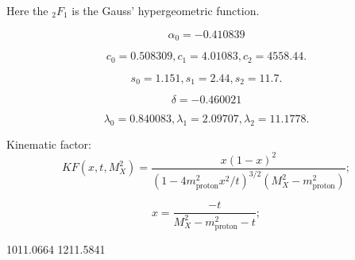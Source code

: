 \documentclass[12pt]{article}
\begin{document}
Here the $_2F_1$ is the Gauss' hypergeometric function.

$$
\alpha_0=-0.410839
$$

$$
c_0=  0.508309,
c_1 = 4.01083,
c_2 = 4558.44.
$$
  
$$
s_0=  1.151,
s_1 = 2.44,
s_2 = 11.7.
$$

$$
\delta=-0.460021
$$

$$
\lambda_0=  0.840083,
\lambda_1 = 2.09707,
\lambda_2 = 11.1778.
$$

Kinematic factor:
$$
KF(x,t,M_X^2) = \frac{x (1-x)^2}{\left(1 - 4m_\textrm{proton}^2x^2/t\right)^{3/2}(M_X^2-m_\textrm{proton}^2)};
$$

$$
x = \frac{-t}{M_X^2 - m_\textrm{proton}^2 - t};
$$




\begin{thebibliography}{99}
 1011.0664
 1211.5841
\end{thebibliography}
\end{document}
